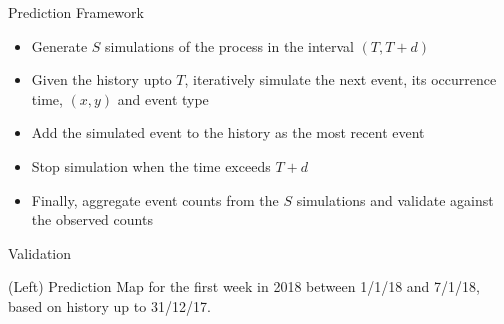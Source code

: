 \documentclass{beamer}
\begin{document}
\begin{frame}{Prediction Framework}
\begin{itemize}
    \item Generate $S$ simulations of the process in the interval $(T, T + d)$\bigskip
    \item Given the history upto $T$, iteratively simulate the next event, its occurrence time, $(x, y)$ and event type\bigskip
    \item Add the simulated event to the history as the most recent event\bigskip
    \item Stop simulation when the time exceeds $T + d$\bigskip
    \item Finally, aggregate event counts from the $S$ simulations and validate against the observed counts
\end{itemize}   
\end{frame}

\begin{frame}{Validation}
\begin{figure}
    \centering
\end{figure}
(Left) Prediction Map for the first week in 2018 between 1/1/18 and 7/1/18, based on history up to 31/12/17.
\end{frame}
\end{document}
